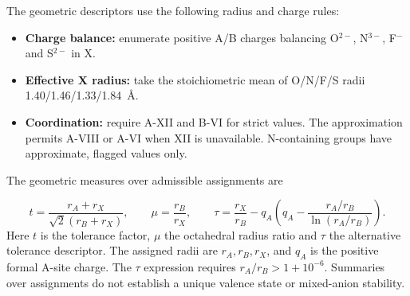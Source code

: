 The geometric descriptors use the following radius and charge rules:
\begin{itemize}
  \item \textbf{Charge balance:} enumerate positive A/B charges balancing O$^{2-}$, N$^{3-}$, F$^{-}$ and S$^{2-}$ in X.
  \item \textbf{Effective X radius:} take the stoichiometric mean of O/N/F/S radii 1.40/1.46/1.33/1.84~\AA.
  \item \textbf{Coordination:} require A-XII and B-VI for strict values. The approximation permits A-VIII or A-VI when XII is unavailable. N-containing groups have approximate, flagged values only.
\end{itemize}
The geometric measures over admissible assignments are
\begin{samepage}
\begin{equation}
 t=\frac{r_A+r_X}{\sqrt{2}(r_B+r_X)},\qquad
 \mu=\frac{r_B}{r_X},\qquad
 \tau=\frac{r_X}{r_B}-q_A\left(q_A-\frac{r_A/r_B}{\ln(r_A/r_B)}\right).
 \label{eq:geometry}
\end{equation}
\noindent Here $t$ is the tolerance factor, $\mu$ the octahedral radius ratio and $\tau$ the alternative tolerance descriptor. The assigned radii are $r_A,r_B,r_X$, and $q_A$ is the positive formal A-site charge. The $\tau$ expression requires $r_A/r_B>1+10^{-6}$. Summaries over assignments do not establish a unique valence state or mixed-anion stability.
\end{samepage}

